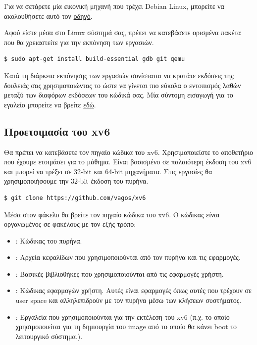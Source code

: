 \documentclass[18pt]{extarticle}
\begin{document}
Για να σετάρετε μία εικονική μηχανή που τρέχει Debian Linux, μπορείτε να ακολουθήσετε αυτό τον \href{}{οδηγό}. %

Αφού είστε μέσα στο Linux σύστημά σας, πρέπει να κατεβάσετε ορισμένα πακέτα που θα χρειαστείτε για την εκπόνηση των εργασιών.

\begin{commandline}
\begin{verbatim}
$ sudo apt-get install build-essential gdb git qemu
\end{verbatim}
\end{commandline}

Κατά τη διάρκεια εκπόνησης των εργασιών συνίσταται να κρατάτε εκδόσεις της δουλειάς σας χρησιμοποιώντας το 
ώστε να γίνεται πιο εύκολα ο εντοπισμός λαθών μεταξύ των διαφόρων εκδόσεων του κώδικά σας.
Μία σύντομη εισαγωγή για το εγαλείο μπορείτε να βρείτε \href{https://rogerdudler.github.io/git-guide/}{εδώ}. 

\subsection{Προετοιμασία του xv6}

Θα πρέπει να κατεβάσετε τον πηγαίο κώδικα του xv6. Χρησιμοποιείστε το αποθετήριο που έχουμε ετοιμάσει για το μάθημα. 
Είναι βασισμένο σε παλαιότερη έκδοση του xv6 και μπορεί να τρέξει σε 32-bit και 64-bit μηχανήματα.
Στις εργασίες θα χρησιμοποιήσουμε την 32-bit έκδοση του πυρήνα.

\begin{commandline}
\begin{verbatim}
$ git clone https://github.com/vagos/xv6
\end{verbatim}
\end{commandline}

Μέσα στον φάκελο  θα βρείτε τον πηγαίο κώδικα του xv6.
Ο κώδικας είναι οργανωμένος σε φακέλους με τον εξής τρόπο: 

\begin{itemize}[label={--}]
    \item {}: Κώδικας του πυρήνα.
    \item {}: Αρχεία κεφαλίδων που χρησιμοποιούνται από τον πυρήνα και τις εφαρμογές.
    \item {}: Βασικές βιβλιοθήκες που χρησιμοποιούνται από τις εφαρμογές χρήστη.
    \item {}: Κώδικας εφαρμογών χρήστη. Αυτές είναι εφαρμογές όπως αυτές που τρέχουν σε user space και αλληλεπιδρούν με τον πυρήνα μέσω των κλήσεων συστήματος.
    \item {}: Εργαλεία που χρησιμοποιούνται για την εκτέλεση του xv6 (π.χ.  το οποίο χρησιμοποιείται για τη δημιουργία του image από το οποίο θα κάνει boot το λειτουργικό σύστημα.).
\end{itemize}
\end{document}
